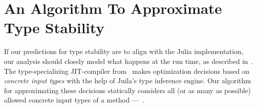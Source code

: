 \documentclass[sigplan,review,anonymous]{acmart}
\begin{document}
\section{An Algorithm To Approximate Type Stability}%
\label{sec:algo}

If our predictions for type stability are to align with the Julia
implementation, our analysis should closely model what happens at the run time,
as described in~\cite{Pelenitsyn21}. The type-specializing JIT-compiler
from~\cite{Pelenitsyn21} makes optimization decisions based on \emph{concrete
  input types} with the help of Juila's type inference engine. Our algorithm for
approximating these decisions statically considers all (or as many as
possible) allowed concrete input types of a method ---~.


\end{document}
